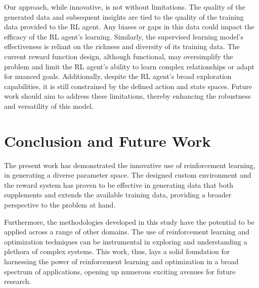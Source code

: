 \documentclass{article}
\begin{document}
Our approach, while innovative, is not without limitations. The quality of the generated data and subsequent insights are tied to the quality of the training data provided to the RL agent. Any biases or gaps in this data could impact the efficacy of the RL agent's learning. Similarly, the supervised learning model's effectiveness is reliant on the richness and diversity of its training data. The current reward function design, although functional, may oversimplify the problem and limit the RL agent's ability to learn complex relationships or adapt for nuanced goals. Additionally, despite the RL agent's broad exploration capabilities, it is still constrained by the defined action and state spaces. Future work should aim to address these limitations, thereby enhancing the robustness and versatility of this model.

\section{Conclusion and Future Work}

The present work has demonstrated the innovative use of reinforcement learning, in generating a diverse parameter space. The designed custom environment and the reward system has proven to be effective in generating data that both supplements and extends the available training data, providing a broader perspective to the problem at hand.

Furthermore, the methodologies developed in this study have the potential to be applied across a range of other domains. The use of reinforcement learning and optimization techniques can be instrumental in exploring and understanding a plethora of complex systems. This work, thus, lays a solid foundation for harnessing the power of reinforcement learning and optimization in a broad spectrum of applications, opening up numerous exciting avenues for future research.





\end{document}
